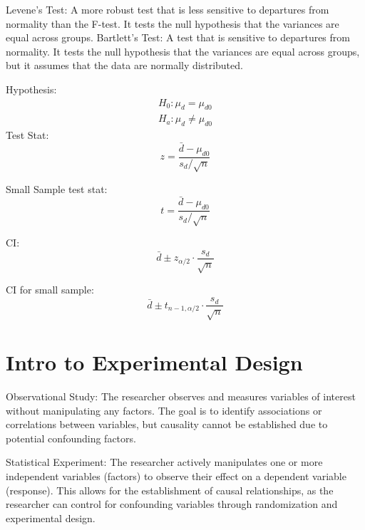 \documentclass[answers,12pt,addpoints]{exam}
\begin{document}
\begin{remark}
    Levene's Test: A more robust test that is less sensitive to departures from normality than the F-test. It tests the null hypothesis that the variances are equal across groups.
    Bartlett's Test: A test that is sensitive to departures from normality. It tests the null hypothesis that the variances are equal across groups, but it assumes that the data are normally distributed.
\end{remark}

\begin{definition}
    [Paired Difference test of Hypothesis about $\mu_d = \mu_1 - \mu_2$]

    Hypothesis:
\begin{align*}
    H_0: \mu_d = \mu_{d0} \\
    H_a: \mu_d \neq \mu_{d0}
\end{align*}
    Test Stat:
    \[
    z = \frac{\bar{d} - \mu_{d0}}{s_d / \sqrt{n}}
    \]

    Small Sample test stat:
    \[
    t = \frac{\bar{d} - \mu_{d0}}{s_d / \sqrt{n}}
    \]

    CI:
    \[
    \bar{d} \pm z_{\alpha/2} \cdot \frac{s_d}{\sqrt{n}}
    \]

    CI for small sample:
    \[
    \bar{d} \pm t_{n-1, \alpha/2} \cdot \frac{s_d}{\sqrt{n}}
    \]
\end{definition}

\section{Intro to Experimental Design}

\begin{remark}
    Observational Study: The researcher observes and measures variables of interest without manipulating any factors. The goal is to identify associations or correlations between variables, but causality cannot be established due to potential confounding factors.

    Statistical Experiment: The researcher actively manipulates one or more independent variables (factors) to observe their effect on a dependent variable (response). This allows for the establishment of causal relationships, as the researcher can control for confounding variables through randomization and experimental design.
\end{remark}
\end{document}
